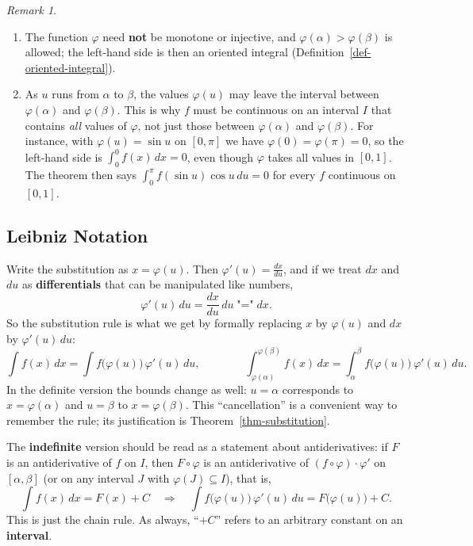 \documentclass[
  letterpaper,
  DIV=11,
  numbers=noendperiod]{scrreprt}
\providecommand{\tightlist}{%
  \setlength{\itemsep}{0pt}\setlength{\parskip}{0pt}}
\theoremstyle{plain}
\theoremstyle{plain}
\theoremstyle{definition}
\theoremstyle{definition}
\theoremstyle{definition}
\theoremstyle{plain}
\theoremstyle{plain}
\theoremstyle{remark}
\newtheorem{refremark}{Remark}[chapter]
\begin{document}
\begin{refremark}
\leavevmode

\begin{enumerate}
\def\labelenumi{\arabic{enumi}.}
\tightlist
\item
  The function \(\varphi\) need \textbf{not} be monotone or injective,
  and \(\varphi(\alpha)>\varphi(\beta)\) is allowed; the left-hand side
  is then an oriented integral (Definition~\ref{def-oriented-integral}).
\item
  As \(u\) runs from \(\alpha\) to \(\beta\), the values \(\varphi(u)\)
  may leave the interval between \(\varphi(\alpha)\) and
  \(\varphi(\beta)\). This is why \(f\) must be continuous on an
  interval \(I\) that contains \emph{all} values of \(\varphi\), not
  just those between \(\varphi(\alpha)\) and \(\varphi(\beta)\). For
  instance, with \(\varphi(u)=\sin u\) on \([0,\pi]\) we have
  \(\varphi(0)=\varphi(\pi)=0\), so the left-hand side is
  \(\int_0^0 f(x)\,dx = 0\), even though \(\varphi\) takes all values in
  \([0,1]\). The theorem then says
  \(\int_0^\pi f(\sin u)\cos u\,du = 0\) for every \(f\) continuous on
  \([0,1]\).
\end{enumerate}

\label{rem-substitution-hypotheses}

\end{refremark}

\subsection{Leibniz Notation}\label{leibniz-notation}

Write the substitution as \(x = \varphi(u)\). Then
\(\varphi'(u) = \frac{dx}{du}\), and if we treat \(dx\) and \(du\) as
\textbf{differentials} that can be manipulated like numbers, \[
\varphi'(u)\,du = \frac{dx}{du}\,du \;\text{"="}\; dx .
\] So the substitution rule is what we get by formally replacing \(x\)
by \(\varphi(u)\) and \(dx\) by \(\varphi'(u)\,du\): \[
\int f(x)\,dx = \int f\big(\varphi(u)\big)\,\varphi'(u)\,du ,
\qquad\qquad
\int_{\varphi(\alpha)}^{\varphi(\beta)} f(x)\,dx = \int_\alpha^\beta f\big(\varphi(u)\big)\,\varphi'(u)\,du .
\] In the definite version the bounds change as well: \(u=\alpha\)
corresponds to \(x=\varphi(\alpha)\) and \(u=\beta\) to
\(x=\varphi(\beta)\). This ``cancellation'' is a convenient way to
remember the rule; its justification is Theorem~\ref{thm-substitution}.

The \textbf{indefinite} version should be read as a statement about
antiderivatives: if \(F\) is an antiderivative of \(f\) on \(I\), then
\(F\circ\varphi\) is an antiderivative of
\((f\circ\varphi)\cdot\varphi'\) on \([\alpha,\beta]\) (or on any
interval \(J\) with \(\varphi(J)\subseteq I\)), that is, \[
\int f(x)\,dx = F(x) + C \quad\Longrightarrow\quad
\int f\big(\varphi(u)\big)\,\varphi'(u)\,du = F\big(\varphi(u)\big) + C .
\] This is just the chain rule. As always, ``\(+C\)'' refers to an
arbitrary constant on an \textbf{interval}.
\end{document}
